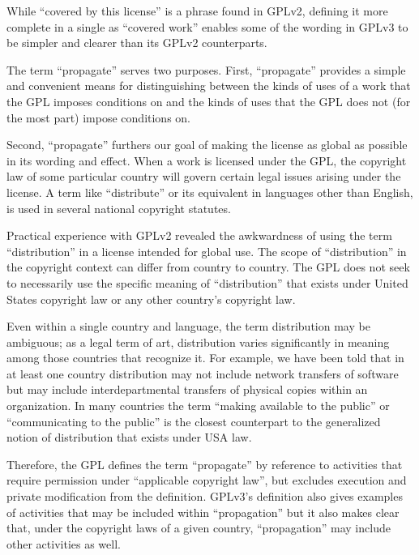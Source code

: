 
While ``covered by this license'' is a phrase found in GPLv2, defining it
more complete in a single as ``covered work'' enables some of the wording in
GPLv3 to be simpler and clearer than its GPLv2 counterparts.


The term ``propagate'' serves two purposes.  First, ``propagate'' provides a
simple and convenient means for distinguishing between the kinds of uses of a
work that the GPL imposes conditions on and the kinds of uses that the GPL
does not (for the most part) impose conditions on.

Second, ``propagate'' furthers our goal of making the license as global as
possible in its wording and effect.  When a work is licensed under the GPL,
the copyright law of some particular country will govern certain legal issues
arising under the license.  A term like ``distribute'' or its equivalent in
languages other than English, is used in several national copyright statutes.

Practical experience with GPLv2 revealed the awkwardness of using the
term ``distribution'' in a license intended for global use.  
The scope of ``distribution'' in the copyright context can differ from
country to country.  The GPL does not seek to necessarily use the specific
meaning of ``distribution'' that exists under United States copyright law or
any other country's copyright law.


Even within a single country and language, the term distribution may be
ambiguous; as a legal term of art, distribution varies significantly in
meaning among those countries that recognize it.  For example, we have been
told that in at least one country distribution may not include network
transfers of software but may include interdepartmental transfers of physical
copies within an organization.  In many countries the term ``making available
to the public'' or ``communicating to the public'' is the closest counterpart
to the generalized notion of distribution that exists under USA law.

Therefore, the GPL defines the term ``propagate'' by reference to activities
that require permission under ``applicable copyright law'', but excludes
execution and private modification from the definition.  GPLv3's definition
also gives examples of activities that may be included within ``propagation''
but it also makes clear that, under the copyright laws of a given country,
``propagation'' may include other activities as well.

